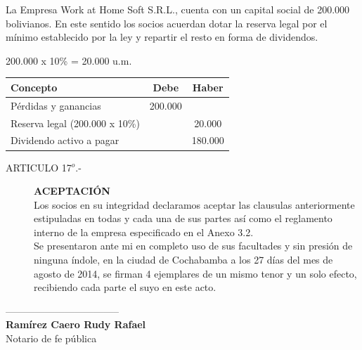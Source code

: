 \documentclass[11pt,letterpaper]{report}
\begin{document}
La Empresa Work at Home Soft S.R.L., cuenta con un capital social de 200.000 bolivianos.
En este sentido los socios acuerdan dotar la reserva legal por el m\'inimo establecido por la ley y repartir el resto en forma de dividendos.
\begin{center}
200.000 x 10\% = 20.000 u.m.
\end{center}
\begin{center}


\begin{tabular}{l|c|c}
Concepto & Debe & Haber\\\hline
P\'erdidas y ganancias & 200.000 & \\
Reserva legal (200.000 x 10\%) & ~ & 20.000\\
Dividendo activo a pagar & ~ & 180.000
\end{tabular}
\end{center}
\begin{description}
\item[ARTICULO 17$^{o}$.-]{\bf ACEPTACI\'ON}\\
Los socios en su integridad declaramos aceptar las clausulas anteriormente estipuladas en todas y cada una de sus partes as\'i como el reglamento interno de la empresa especificado en el Anexo 3.2.\\
Se presentaron ante mi en completo uso de sus facultades y sin presi\'on de ninguna \'indole, en la ciudad de Cochabamba a los 27 d\'ias del mes de agosto de 2014, se firman 4 ejemplares de un mismo tenor y un solo efecto, recibiendo cada parte el suyo en este acto.
\end{description}





\vspace{6em}


\begin{center}
-----------------------------------\\
{\bf Ramírez Caero Rudy Rafael}\\
Notario de fe p\'ublica\\
\end{center}
~\\\vspace{2em}
\end{document}
